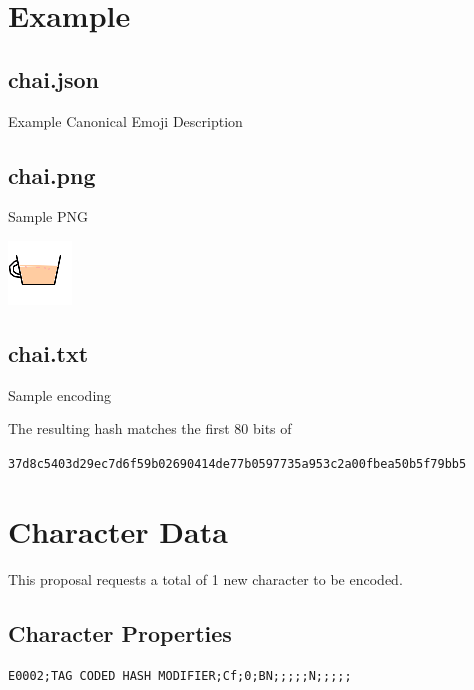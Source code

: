 \documentclass[12pt]{article}
\begin{document}
\section{Example}

\subsection{chai.json}

Example Canonical Emoji Description



\subsection{chai.png}

Sample PNG

\includegraphics{chai.png}

\subsection{chai.txt}

Sample encoding



%


The resulting hash matches the first 80 bits of 

\small{\texttt{37d8c5403d29ec7d6f59b02690414de77b0597735a953c2a00fbea50b5f79bb5}}

\section{Character Data}

This proposal requests a total of 1 new character to be encoded.

\subsection{Character Properties}

\begin{verbatim}
E0002;TAG CODED HASH MODIFIER;Cf;0;BN;;;;;N;;;;;
\end{verbatim}
\end{document}
